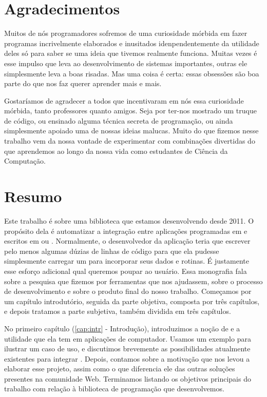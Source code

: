\documentclass[11pt,twoside,a4paper]{book}
\begin{document}
\chapter*{Agradecimentos}

Muitos de nós programadores sofremos de uma curiosidade mórbida em fazer
programas incrivelmente elaborados e inusitados idenpendentemente da utilidade
deles só para saber se uma ideia que tivemos realmente funciona. Muitas vezes é
esse impulso que leva ao desenvolvimento de sistemas importantes, outras ele
simplesmente leva a boas risadas. Mas uma coisa é certa: essas obsessões são boa
parte do que nos faz querer aprender mais e mais.

Gostaríamos de agradecer a todos que incentivaram em nós essa curiosidade
mórbida, tanto professores quanto amigos. Seja por ter-nos mostrado um truque
de código, ou ensinado alguma técnica secreta de programação, ou ainda
simplesmente apoiado uma de nossas ideias malucas. Muito do que fizemos nesse
trabalho vem da nossa vontade de experimentar com combinações divertidas do que
aprendemos ao longo da nossa vida como estudantes de Ciência da Computação.

\chapter*{Resumo}

Este trabalho é sobre uma biblioteca \CXX{} que estamos desenvolvendo desde
2011. O propósito dela é automatizar a integração entre aplicações programadas
em \CXX{} e  escritos em  ou . Normalmente,
o desenvolvedor da aplicação teria que escrever pelo menos algumas dúzias
de linhas de código para que ela pudesse simplesmente carregar um \script{}
para incorporar seus dados e rotinas. É justamente esse esforço adicional
qual queremos poupar ao usuário. Essa monografia fala sobre a pesquisa que
fizemos por ferramentas que nos ajudassem, sobre o processo de desenvolvimento
e sobre o produto final do nosso trabalho. Começamos por um capítulo introdutório,
seguida da parte objetiva, composta por três capítulos, e depois tratamos
a parte subjetiva, também dividida em três capítulos.

No primeiro capítulo (\ref{cap:intr} - Introdução), introduzimos a noção de
 e a utilidade que ela tem em aplicações de computador. Usamos um
exemplo para ilustrar um caso de uso, e discutimos brevemente as possibilidades
atualmente existentes para integrar . Depois, contamos sobre a
motivação que nos levou a elaborar esse projeto, assim como o que diferencia
ele das outras soluções presentes na comunidade Web. Terminamos listando os
objetivos principais do trabalho com relação à biblioteca de programação
que desenvolvemos.
\end{document}
